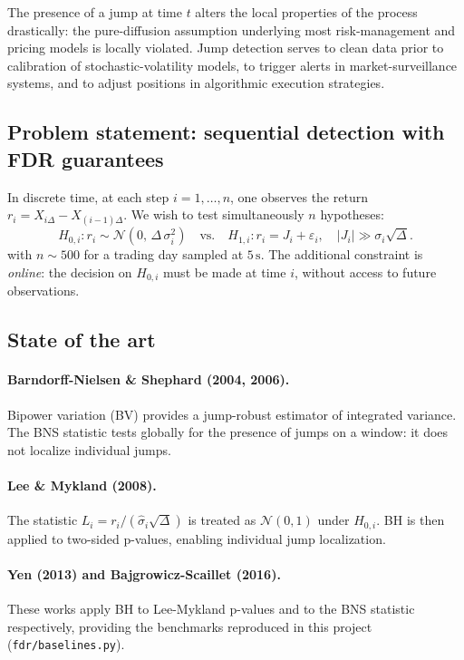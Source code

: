 \documentclass[11pt,a4paper]{article}
\theoremstyle{plain}
\theoremstyle{definition}
\theoremstyle{remark}
\newcommand{\dt}{\Delta}
\newcommand{\shat}{\hat{\sigma}}
\begin{document}
The presence of a jump at time $t$ alters the local properties of the process
drastically: the pure-diffusion assumption underlying most risk-management and
pricing models is locally violated. Jump detection serves to clean data prior
to calibration of stochastic-volatility models, to trigger alerts in
market-surveillance systems, and to adjust positions in algorithmic execution
strategies.

\subsection{Problem statement: sequential detection with FDR guarantees}

In discrete time, at each step $i = 1, \ldots, n$, one observes the return
$r_i = X_{i\dt} - X_{(i-1)\dt}$. We wish to test simultaneously $n$ hypotheses:
\begin{equation}
  H_{0,i} : r_i \sim \mathcal{N}(0,\, \dt\,\sigma_i^2)
  \quad\text{vs.}\quad
  H_{1,i} : r_i = J_i + \varepsilon_i,\quad |J_i| \gg \sigma_i\sqrt{\dt}.
\end{equation}
with $n \sim 500$ for a trading day sampled at $5\,\mathrm{s}$. The additional
constraint is \emph{online}: the decision on $H_{0,i}$ must be made at time
$i$, without access to future observations.

\subsection{State of the art}

\paragraph{Barndorff-Nielsen \& Shephard (2004, 2006).}
Bipower variation (BV) provides a jump-robust estimator of integrated
variance. The BNS statistic tests globally for the presence of jumps on a
window: it does not localize individual jumps.

\paragraph{Lee \& Mykland (2008).}
The statistic $L_i = r_i / (\shat_i \sqrt{\dt})$ is treated as $\mathcal{N}(0,1)$
under $H_{0,i}$. BH \cite{BH1995} is then applied to two-sided p-values,
enabling individual jump localization.

\paragraph{Yen (2013) and Bajgrowicz-Scaillet (2016).}
These works apply BH to Lee-Mykland p-values and to the BNS statistic
respectively, providing the benchmarks reproduced in this project
(\texttt{fdr/baselines.py}).
\end{document}
